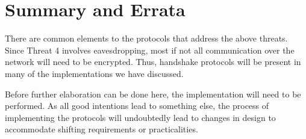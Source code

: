 \documentclass[11pt]{article}
\begin{document}
\section{Summary and Errata}
There are common elements to the protocols that address the above threats. Since Threat 4 involves eavesdropping, most if not all communication over the network will need to be encrypted. Thus, handshake protocols will be present in many of the implementations we have discussed.

Before further elaboration can be done here, the implementation will need to be performed. As all good intentions lead to something else, the process of implementing the protocols will undoubtedly lead to changes in design to accommodate shifting requirements or practicalities.
\end{document}

